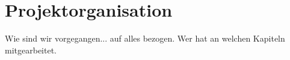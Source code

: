 \section{Projektorganisation}

Wie sind wir vorgegangen... auf alles bezogen. Wer hat an welchen Kapiteln mitgearbeitet.